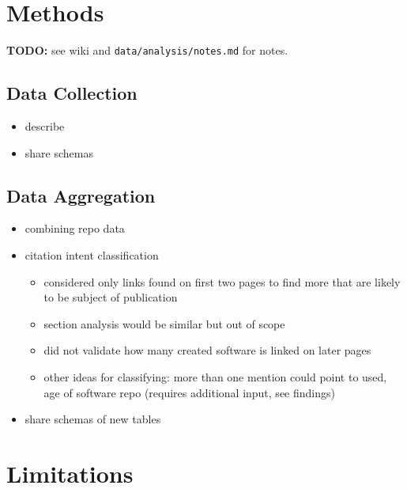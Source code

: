 \documentclass[10pt,a4paper]{scrartcl}
\begin{document}
\section*{Methods}

\textbf{TODO: }see wiki and \verb|data/analysis/notes.md| for notes.

\subsection*{Data Collection}

\begin{itemize}
    \item describe
    \item share schemas
\end{itemize}

\subsection*{Data Aggregation}

\begin{itemize}
    \item combining repo data
    \item citation intent classification
    \begin{itemize}
        \item considered only links found on first two pages to find more that are likely to be subject of publication
        \item section analysis would be similar but out of scope
        \item did not validate how many created software is linked on later pages
        \item other ideas for classifying: more than one mention could point to used, age of software repo (requires additional input, see findings)
    \end{itemize}
    \item share schemas of new tables
\end{itemize}

\section*{Limitations}
\end{document}
